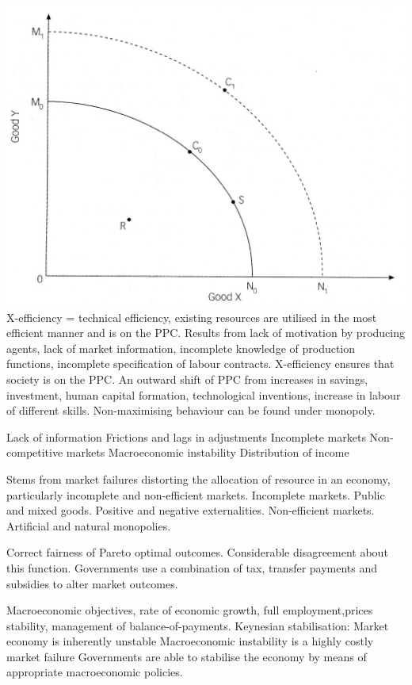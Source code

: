 \documentclass[12pt]{examnotes}
\begin{document}
\includegraphics[scale=0.25]{./imgs/25.jpg}
\ra X-efficiency = technical efficiency, existing resources are utilised in the most efficient manner and is on the PPC.
\ra Results from lack of motivation by producing agents, lack of market information, incomplete knowledge of production functions, incomplete specification of labour contracts.
\ra X-efficiency ensures that society is on the PPC.
\ra An outward shift of PPC from increases in savings, investment, human capital formation, technological  inventions, increase in labour of different skills.
\ra Non-maximising behaviour can be found under monopoly.

\ra Lack of information 
\ra Frictions and lags in adjustments
\ra Incomplete markets
\ra Non-competitive markets
\ra Macroeconomic instability
\ra Distribution of income

\ra Stems from market failures distorting the allocation of resource in an economy, particularly incomplete and non-efficient markets.
\ra  Incomplete markets. Public and mixed goods. Positive and negative externalities.
\ra Non-efficient markets. Artificial and natural monopolies.

\ra Correct fairness of Pareto optimal outcomes.
\ra Considerable disagreement about this function.
\ra Governments use a combination of tax, transfer payments and subsidies to alter market outcomes.

\ra Macroeconomic objectives, rate of economic growth, full employment,prices stability, management of balance-of-payments.
\ra Keynesian stabilisation:
 Market economy is inherently unstable
 Macroeconomic instability is a highly costly market failure
 Governments are able to stabilise the economy by means of appropriate macroeconomic policies.
\end{document}

